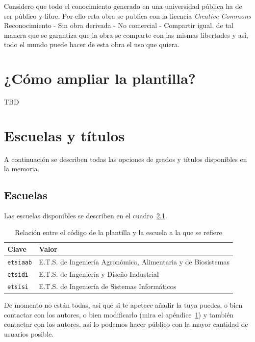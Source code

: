 \documentclass[%
    school=etsisi,%
    degree=61TI,%
]{upm-report}
\begin{document}
Considero que todo el conocimiento generado en una universidad pública ha de ser público y libre. Por ello esta obra se publica con la licencia \textit{Creative Commons} Reconocimiento - Sin obra derivada - No comercial - Compartir igual, de tal manera que se garantiza que la obra se comparte con las mismas libertades y así, todo el mundo puede hacer de esta obra el uso que quiera.

\appendix

\chapter{¿Cómo ampliar la plantilla?}
\label{ch:ampliar}

TBD

\chapter{Escuelas y títulos}
\label{ch:escuelas-y-titulos}

A continuación se describen todas las opciones de grados y títulos disponibles en la memoria.

\section{Escuelas}

Las escuelas disponibles se describen en el cuadro~\ref{tbl:schools}.

\begin{table}
    \centering
    \begin{tabularx}{\textwidth}{@{}lX@{}}
        \toprule
        \textbf{Clave}   & \textbf{Valor} \\
        \midrule
        \texttt{etsiaab} & E.T.S. de Ingeniería Agronómica, Alimentaria y de Biosistemas \\
        \texttt{etsidi}  & E.T.S. de Ingeniería y Diseño Industrial \\
        \texttt{etsisi}  & E.T.S. de Ingeniería de Sistemas Informáticos \\
        \bottomrule
    \end{tabularx}
    \caption{\label{tbl:schools} Relación entre el código de la plantilla y la escuela a la que se refiere}
\end{table}

De momento no están todas, así que si te apetece añadir la tuya puedes, o bien contactar con los autores, o bien modificarlo (mira el apéndice~\ref{ch:ampliar}) y también contactar con los autores, así lo podemos hacer público con la mayor cantidad de usuarios posible.
\end{document}
